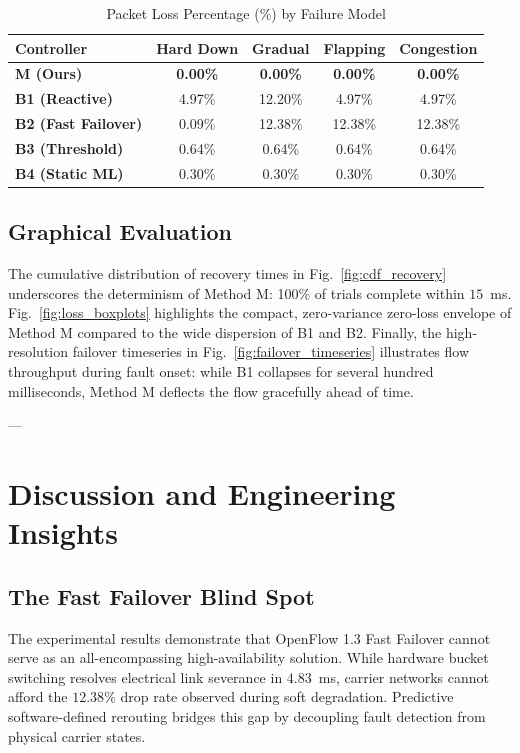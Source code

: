 \documentclass[10pt,twocolumn]{article}
\begin{document}
\begin{table}[!t]
\centering
\caption{Packet Loss Percentage (\%) by Failure Model}
\label{tab:fault_loss}
\begin{tabular}{lcccc}
\toprule
\textbf{Controller} & \textbf{Hard Down} & \textbf{Gradual} & \textbf{Flapping} & \textbf{Congestion} \\
\midrule
\textbf{M (Ours)} & \textbf{0.00\%} & \textbf{0.00\%} & \textbf{0.00\%} & \textbf{0.00\%} \\
\textbf{B1 (Reactive)} & 4.97\% & 12.20\% & 4.97\% & 4.97\% \\
\textbf{B2 (Fast Failover)} & 0.09\% & 12.38\% & 12.38\% & 12.38\% \\
\textbf{B3 (Threshold)} & 0.64\% & 0.64\% & 0.64\% & 0.64\% \\
\textbf{B4 (Static ML)} & 0.30\% & 0.30\% & 0.30\% & 0.30\% \\
\bottomrule
\end{tabular}
\end{table}

\subsection{Graphical Evaluation}
The cumulative distribution of recovery times in Fig.~\ref{fig:cdf_recovery} underscores the determinism of Method M: 100\% of trials complete within $15$~ms. Fig.~\ref{fig:loss_boxplots} highlights the compact, zero-variance zero-loss envelope of Method M compared to the wide dispersion of B1 and B2. Finally, the high-resolution failover timeseries in Fig.~\ref{fig:failover_timeseries} illustrates flow throughput during fault onset: while B1 collapses for several hundred milliseconds, Method M deflects the flow gracefully ahead of time.

---

\section{Discussion and Engineering Insights}
\label{sec:discussion}

\subsection{The Fast Failover Blind Spot}
The experimental results demonstrate that OpenFlow 1.3 Fast Failover cannot serve as an all-encompassing high-availability solution. While hardware bucket switching resolves electrical link severance in $4.83$~ms, carrier networks cannot afford the $12.38\%$ drop rate observed during soft degradation. Predictive software-defined rerouting bridges this gap by decoupling fault detection from physical carrier states.
\end{document}

